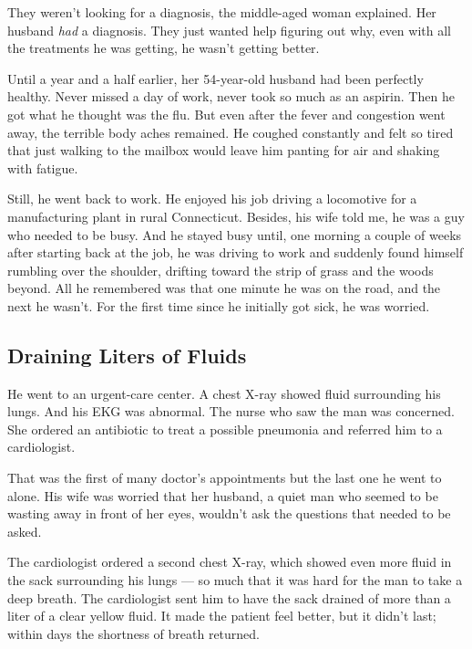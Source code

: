 They weren't looking for a diagnosis, the middle-aged woman explained.
Her husband \emph{had} a diagnosis. They just wanted help figuring out
why, even with all the treatments he was getting, he wasn't getting
better.

Until a year and a half earlier, her 54-year-old husband had been
perfectly healthy. Never missed a day of work, never took so much as an
aspirin. Then he got what he thought was the flu. But even after the
fever and congestion went away, the terrible body aches remained. He
coughed constantly and felt so tired that just walking to the mailbox
would leave him panting for air and shaking with fatigue.

Still, he went back to work. He enjoyed his job driving a locomotive for
a manufacturing plant in rural Connecticut. Besides, his wife told me,
he was a guy who needed to be busy. And he stayed busy until, one
morning a couple of weeks after starting back at the job, he was driving
to work and suddenly found himself rumbling over the shoulder, drifting
toward the strip of grass and the woods beyond. All he remembered was
that one minute he was on the road, and the next he wasn't. For the
first time since he initially got sick, he was worried.

\hypertarget{draining-liters-of-fluids}{%
\subsection{\texorpdfstring{\textbf{Draining Liters of
Fluids}}{Draining Liters of Fluids}}\label{draining-liters-of-fluids}}

He went to an urgent-care center. A chest X-ray showed fluid surrounding
his lungs. And his EKG was abnormal. The nurse who saw the man was
concerned. She ordered an antibiotic to treat a possible pneumonia and
referred him to a cardiologist.

That was the first of many doctor's appointments but the last one he
went to alone. His wife was worried that her husband, a quiet man who
seemed to be wasting away in front of her eyes, wouldn't ask the
questions that needed to be asked.

The cardiologist ordered a second chest X-ray, which showed even more
fluid in the sack surrounding his lungs --- so much that it was hard for
the man to take a deep breath. The cardiologist sent him to have the
sack drained of more than a liter of a clear yellow fluid. It made the
patient feel better, but it didn't last; within days the shortness of
breath returned.

